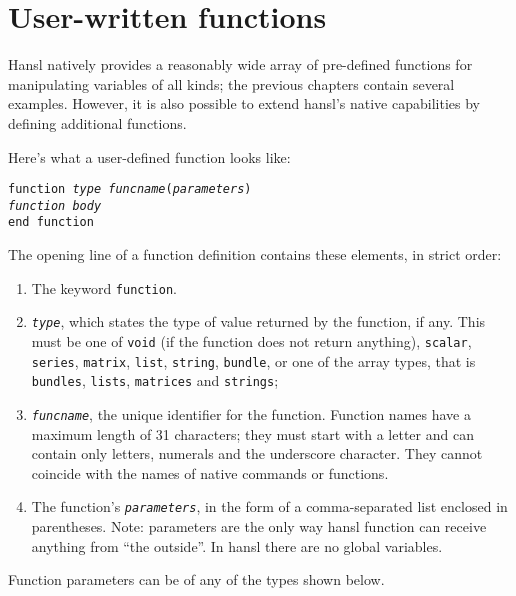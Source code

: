 \chapter{User-written functions}
\label{chap:user-funcs}

Hansl natively provides a reasonably wide array of pre-defined
functions for manipulating variables of all kinds; the previous
chapters contain several examples. However, it is also possible to
extend hansl's native capabilities by defining additional
functions.

Here's what a user-defined function looks like:
\begin{flushleft}
\texttt{function \emph{type} \emph{funcname}(\emph{parameters})}\\
   \quad \texttt{\emph{function body}}\\
\texttt{end function}
\end{flushleft}

The opening line of a function definition contains these elements, in
strict order:

\begin{enumerate}
\item The keyword \texttt{function}.
\item \texttt{\emph{type}}, which states the type of value returned by
  the function, if any.  This must be one of \texttt{void} (if the
  function does not return anything), \texttt{scalar},
  \texttt{series}, \texttt{matrix}, \texttt{list}, \texttt{string},
  \texttt{bundle}, or one of the array types, that is \texttt{bundles},
  \texttt{lists}, \texttt{matrices} and \texttt{strings};
\item \texttt{\emph{funcname}}, the unique identifier for the
  function.  Function names have a maximum length of 31 characters;
  they must start with a letter and can contain only letters, numerals
  and the underscore character. They cannot coincide with the names of
  native commands or functions.
\item The function's \texttt{\emph{parameters}}, in the form of a
  comma-separated list enclosed in parentheses. Note: parameters are
  the only way hansl function can receive anything from ``the
  outside''. In hansl there are no global variables.
\end{enumerate}

Function parameters can be of any of the types shown below.

